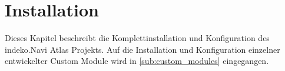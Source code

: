 \tableofcontents

\newpage
\listoffigures
\thispagestyle{empty}

\glsaddall
\printglossary[type=\acronymtype,title = Abkürzungsverzeichnis]

\newpage
\restoregeometry
{}




\section{Installation}
Dieses Kapitel beschreibt die Komplettinstallation und Konfiguration des \acrshort{indeko}.Navi Atlas Projekts. Auf die Installation und Konfiguration einzelner entwickelter Custom Module wird in \cref{sub:custom_modules} eingegangen.


